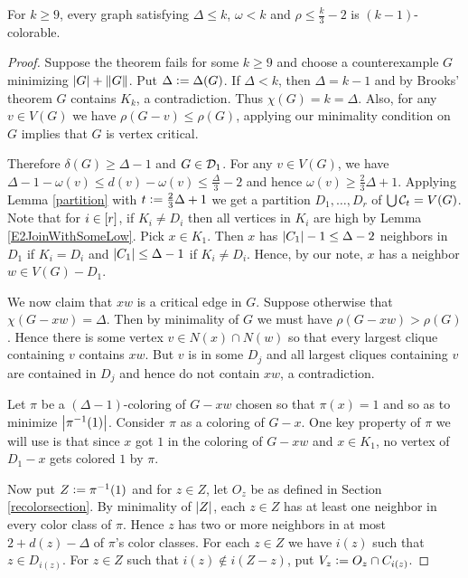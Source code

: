 \begin{thm}
For $k \geq 9$, every graph satisfying $\Delta \leq k$, $\omega < k$ and $\rho
\leq \frac{k}{3} - 2$ is $(k-1)$-colorable.
\end{thm}
\begin{proof}
Suppose the theorem fails for some $k \geq 9$ and choose a counterexample
$G$ minimizing $\left|G\right| + \left\Vert G\right\Vert$. Put $\Delta \mathrel{\mathop:}= \Delta(G)$.  If
$\Delta < k$, then $\Delta = k-1$ and by Brooks' theorem $G$ contains $K_k$, a
contradiction. Thus $\chi(G) = k = \Delta$.  Also, for any $v
\in V(G)$ we have $\rho(G-v) \leq \rho(G)$, applying our minimality condition on $G$ implies that $G$ is
vertex critical.

Therefore $\delta(G) \geq \Delta - 1$ and $G \in
\mathcal{D}_1$.  For any $v \in V(G)$, we have $\Delta - 1 - \omega(v) \leq d(v) -
\omega(v) \leq \frac{\Delta}{3} - 2$ and hence $\omega(v) \geq \frac23\Delta +
1$. Applying Lemma \ref{partition} with $t \mathrel{\mathop:}= \frac23\Delta + 1$ we
get a partition $D_1, \ldots, D_r$ of $\bigcup \mathcal{C}_t = V(G)$.  Note that for $i
\in \left[r\right]$, if $K_i \neq D_i$ then all vertices in $K_i$ are high by Lemma
\ref{E2JoinWithSomeLow}.  Pick $x \in K_1$.  Then $x$ has $\left|C_1\right| - 1 \leq
\Delta - 2$ neighbors in $D_1$ if $K_i = D_i$ and $\left|C_1\right| \leq \Delta - 1$
if $K_i \neq D_i$.  Hence, by our note, $x$ has a neighbor $w \in V(G) - D_1$.

We now claim that $xw$ is a critical edge in $G$.  Suppose otherwise that
$\chi(G - xw) = \Delta$.  Then by minimality of $G$ we must have $\rho(G-xw) >
\rho(G)$. Hence there is some vertex $v \in N(x) \cap N(w)$ so that every
largest clique containing $v$ contains $xw$.  But $v$ is in some $D_j$ and all largest cliques containing $v$ are contained in $D_j$ and hence do not contain $xw$, a contradiction.  

Let $\pi$ be a $(\Delta-1)$-coloring of $G - xw$ chosen so that $\pi(x) = 1$
and so as to minimize $\left|\pi^{-1}(1)\right|$. Consider $\pi$ as a coloring of
$G-x$. One key property of $\pi$ we will use is that since $x$ got $1$ in the
coloring of $G - xw$ and $x \in K_1$, no vertex of $D_1 - x$ gets colored $1$ by $\pi$.

Now put $Z \mathrel{\mathop:}= \pi^{-1}(1)$ and for $z \in Z$, let $O_z$ be as defined
in Section \ref{recolorsection}.  By minimality of $\left|Z\right|$, each $z \in Z$ has at least one neighbor in every color class of $\pi$.  
Hence $z$ has two or more neighbors in at most $2 + d(z) - \Delta$ of
$\pi$'s color classes. For each $z \in Z$ we have $i(z)$ such that $z \in D_{i(z)}$. For $z \in Z$ such that $i(z) \not \in i(Z - z)$, put $V_z \mathrel{\mathop:}= O_z \cap C_{i(z)}$.  


\end{proof}
